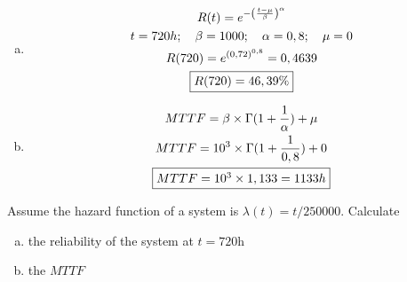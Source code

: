 \documentclass{article}
\begin{document}
\begin{enumerate}[(a)]
    \item
\begin{gather*}
    R(t) = e^{-\left(\frac{t-\mu}{\beta}\right)^\alpha} \\
    t = 720h;\quad \beta = 1000;\quad \alpha = 0,8;\quad \mu = 0 \\
    R(720) = e^{(0,72)^{0,8}} = 0,4639 \\
    \fbox{$R(720) = 46,39\%$}
\end{gather*}
    \item
\begin{gather*}
    MTTF = \beta \times \Gamma(1 + \frac{1}{\alpha}) + \mu \\
    MTTF = 10^3 \times \Gamma(1 + \frac{1}{0,8}) + 0 \\
    \fbox{$MTTF = 10^3 \times 1,133 = 1133 h$}
\end{gather*}
\end{enumerate}

\setcounter{Question}{7}

\begin{question}
	Assume the hazard function of a system is $\lambda (t) = t/250000$. Calculate
	\begin{enumerate}[(a)]
		\item the reliability of the system at $t = 720 \unit{\hour}$
		\item the $MTTF$
	\end{enumerate}
\end{question}
\end{document}
